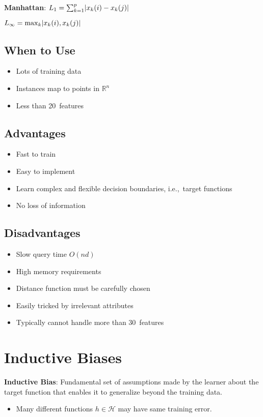 \documentclass[10pt]{article}
\DeclarePairedDelimiter{\abs}{\lvert}{\rvert}
\begin{document}
\begin{multicols}{3}
  \vspace{8pt}\textbf{Manhattan}: $L_1 = \sum_{k=1}^{p} \abs{x_k(i) - x_k(j)}$

  \vspace{8pt}$L_{\infty} = \max_{k}\abs{x_k(i),x_k(j)}$

  \subsection*{When to Use}
  \begin{itemize}
    \item Lots of training data
    \item Instances map to points in $\mathbb{R}^n$
    \item Less than 20~features
  \end{itemize}

  \subsection*{Advantages}
  \begin{itemize}
    \item Fast to train
    \item Easy to implement
    \item Learn complex and flexible decision boundaries, i.e.,~target functions
    \item No loss of information
  \end{itemize}

  \subsection*{Disadvantages}
  \begin{itemize}
    \item Slow query time $O(nd)$
    \item High memory requirements
    \item Distance function must be carefully chosen
    \item Easily tricked by irrelevant attributes
    \item Typically cannot handle more than 30~features
  \end{itemize}

  \section*{Inductive Biases}

  \textbf{Inductive Bias}: Fundamental set of assumptions made by the learner about the target function that enables it to generalize beyond the training data.
  \begin{itemize}
    \item Many different functions $h\in\mathcal{H}$ may have same training error.
  \end{itemize}




\end{multicols}
\end{document}

